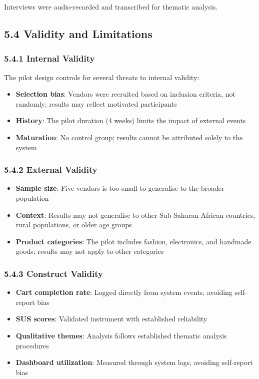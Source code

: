 \documentclass[12pt,a4paper]{article}
\begin{document}
Interviews were audio-recorded and transcribed for thematic analysis.

\subsection{5.4 Validity and Limitations}

\subsubsection{5.4.1 Internal Validity}

The pilot design controls for several threats to internal validity:

\begin{itemize}
    \item \textbf{Selection bias}: Vendors were recruited based on inclusion criteria, not randomly; results may reflect motivated participants
    \item \textbf{History}: The pilot duration (4 weeks) limits the impact of external events
    \item \textbf{Maturation}: No control group; results cannot be attributed solely to the system
\end{itemize}

\subsubsection{5.4.2 External Validity}

\begin{itemize}
    \item \textbf{Sample size}: Five vendors is too small to generalise to the broader population
    \item \textbf{Context}: Results may not generalise to other Sub-Saharan African countries, rural populations, or older age groups
    \item \textbf{Product categories}: The pilot includes fashion, electronics, and handmade goods; results may not apply to other categories
\end{itemize}

\subsubsection{5.4.3 Construct Validity}

\begin{itemize}
    \item \textbf{Cart completion rate}: Logged directly from system events, avoiding self-report bias
    \item \textbf{SUS scores}: Validated instrument \citep{brooke1996} with established reliability
    \item \textbf{Qualitative themes}: Analysis follows established thematic analysis procedures \citep{braun2006}
    \item \textbf{Dashboard utilization}: Measured through system logs, avoiding self-report bias
\end{itemize}
\end{document}
